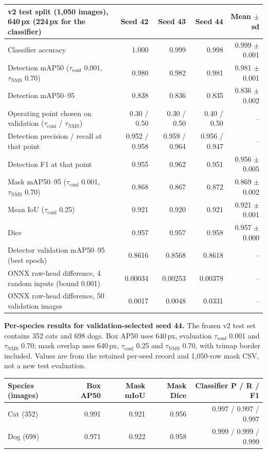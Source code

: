 \documentclass[11pt,a4paper]{article}
\newcommand{\tconf}{$\tau_{\text{conf}}$}
\newcommand{\tnms}{$\tau_{\text{NMS}}$}
\begin{document}
\begin{tabularx}{\linewidth}{@{}Y r r r r@{}}
\toprule
v2 test split (1,050 images), 640\,px (224\,px for the classifier) & Seed 42 & Seed 43 & Seed 44 & Mean $\pm$ sd \\
\midrule
Classifier accuracy & 1.000 & 0.999 & 0.998 & 0.999 $\pm$ 0.001 \\
Detection mAP50 (\tconf{} 0.001, \tnms{} 0.70) & 0.980 & 0.982 & 0.981 & 0.981 $\pm$ 0.001 \\
Detection mAP50--95 & 0.838 & 0.836 & 0.835 & 0.836 $\pm$ 0.002 \\
Operating point chosen on validation (\tconf{} / \tnms{}) & 0.30 / 0.50 & 0.30 / 0.50 & 0.40 / 0.50 & -- \\
Detection precision / recall at that point & 0.952 / 0.958 & 0.959 / 0.964 & 0.956 / 0.947 & -- \\
Detection F1 at that point & 0.955 & 0.962 & 0.951 & 0.956 $\pm$ 0.005 \\
Mask mAP50--95 (\tconf{} 0.001, \tnms{} 0.70) & 0.868 & 0.867 & 0.872 & 0.869 $\pm$ 0.002 \\
Mean IoU (\tconf{} 0.25) & 0.921 & 0.920 & 0.921 & 0.921 $\pm$ 0.001 \\
Dice & 0.957 & 0.957 & 0.958 & 0.957 $\pm$ 0.000 \\
Detector validation mAP50--95 (best epoch) & 0.8616 & 0.8568 & 0.8618 & -- \\
ONNX raw-head difference, 4 random inputs (bound 0.001) & 0.00034 & 0.00253 & 0.00378 & -- \\
ONNX raw-head difference, 50 validation images & 0.0017 & 0.0048 & 0.0331 & -- \\
\bottomrule
\end{tabularx}

\textbf{Per-species results for validation-selected seed 44.} The frozen v2 test set contains 352 cats and 698 dogs. Box AP50 uses 640\,px, evaluation \tconf{} 0.001 and \tnms{} 0.70; mask overlap uses 640\,px, \tconf{} 0.25 and \tnms{} 0.70, with trimap border included. Values are from the retained per-seed record and 1,050-row mask CSV, not a new test evaluation.

\begin{tabularx}{\linewidth}{@{}l r r r r@{}}
\toprule
Species (images) & Box AP50 & Mask mIoU & Mask Dice & Classifier P / R / F1 \\
\midrule
Cat (352) & 0.991 & 0.921 & 0.956 & 0.997 / 0.997 / 0.997 \\
Dog (698) & 0.971 & 0.922 & 0.958 & 0.999 / 0.999 / 0.999 \\
\bottomrule
\end{tabularx}
\end{document}
